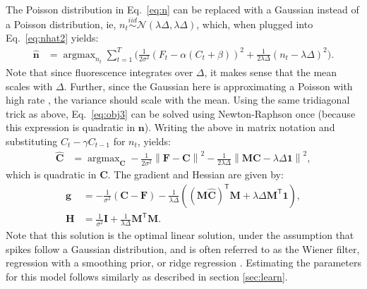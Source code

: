 \documentclass{article}
\providecommand{\ve}[1]{\boldsymbol{#1}}
\providecommand{\norm}[1]{\left \lVert#1 \right  \rVert}
\newcommand{\T}{^{\ensuremath{\mathsf{T}}}}           %
\DeclareMathOperator*{\argmax}{argmax}
\newcommand{\bg}{\ve{g}}
\newcommand{\bn}{\ve{n}}
\newcommand{\bC}{\ve{C}}
\newcommand{\bF}{\ve{F}}
\newcommand{\bH}{\ve{H}}
\newcommand{\bM}{\ve{M}}
\newcommand{\hbn}{\widehat{\ve{n}}}
\newcommand{\hbC}{\widehat{\ve{C}}}
\newcommand{\mN}{\mathcal{N}}
\newcommand{\Del}{\Delta}
\newcommand{\sig}{\sigma}
\newcommand{\lam}{\lambda}
\newcommand{\gam}{\gamma}
\begin{document}
The Poisson distribution in Eq.~\eqref{eq:n} can be replaced with a Gaussian instead of a Poisson distribution, ie,  $n_t \overset{iid}{\sim} \mN(\lam \Del, \lam \Del)$, which, when plugged into Eq.~\eqref{eq:nhat2} yields:
\begin{align} \label{eq:obj5}
\hbn &= \argmax_{n_t}  \sum_{t=1}^T \bigg( \frac{1}{2 \sig^2}(F_t - \alpha(C_t + \beta))^2  + 
 \frac{1}{2 \lam \Del}(n_t - \lam \Del)^2\bigg).
\end{align}
Note that since fluorescence integrates over $\Delta$, it makes sense that the mean scales with $\Delta$.  Further, since the Gaussian here is approximating a Poisson with high rate \cite{SjulsonMiesenbock07}, the variance should scale with the mean.  Using the same tridiagonal trick as above, Eq.~\eqref{eq:obj3} can be solved using Newton-Raphson once (because this expression is quadratic in $\bn$).  Writing the above in matrix notation and substituting $C_t - \gam C_{t-1}$ for $n_t$, yields:
\begin{align}   \label{eq:w2}
\hbC&= \argmax_{\bC} -\frac{1}{2\sig^2} \norm{\bF - \bC}^2 - \frac{1}{2\lam\Del} \norm{\bM \bC - \lam\Del\ve{1}}^2,
\end{align}
\noindent which is quadratic in $\bC$.  The gradient and Hessian are given by:
\begin{align}
\bg &= -\frac{1}{\sig^2} (\bC - \bF) - \frac{1}{\lam\Del} ( (\bM \hbC)\T \bM + \lam\Del \bM\T \ve{1}), \\
\bH &= \frac{1}{\sig^2} \ve{I} + \frac{1}{\lam\Del} \bM\T \bM.
\end{align}
Note that this solution is the optimal linear solution, under the assumption that spikes follow a Gaussian distribution, and is often referred to as the Wiener filter, regression with a smoothing prior, or ridge regression \cite{CONV04}.  Estimating the parameters for this model follows similarly as described in section \ref{sec:learn}.





\clearpage

%
%

%

% 
\end{document}
